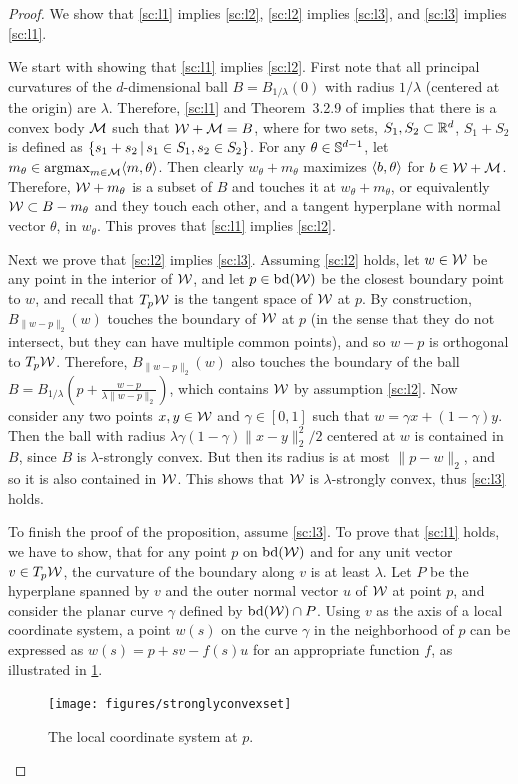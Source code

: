 \begin{proof}
We show that \eqref{sc:l1} implies \eqref{sc:l2}, \eqref{sc:l2} implies \eqref{sc:l3}, and \eqref{sc:l3} implies \eqref{sc:l1}. 

We start with showing that \eqref{sc:l1} implies \eqref{sc:l2}.
First note that all principal curvatures of the $d$-dimensional ball $B=B_{1/\lambda}(0)$ with radius $1/\lambda$ (centered at the origin) are $\lambda$. Therefore, \eqref{sc:l1} and Theorem~3.2.9 of \citet{Sch14:ConvexBodies} implies that there is a convex body $\mathcal{M}$ such that $\mathcal{W}+\mathcal{M}=B$, where for two sets, $S_1, S_2 \subset \mathbb{R}^d$, $S_1+S_2$ is defined as $\left\{s_1+s_2 \,\vert\, s_1 \in S_1, s_2\in S_2 \right\}$. For any $\theta \in \mathbb{S}^{d-1}$, let $m_\theta \in \operatorname*{argmax}_{m \in \mathcal{M}} \langle m,\theta\rangle$. Then clearly $w_\theta+m_\theta$ maximizes $\langle b,\theta\rangle$ for $b \in \mathcal{W}+\mathcal{M}$. Therefore, $\mathcal{W} + m_\theta$ is a subset of $B$ and touches it at $w_\theta+m_\theta$, or equivalently $\mathcal{W} \subset B-m_\theta$ and they touch each other, and a tangent hyperplane with normal vector $\theta$, in $w_\theta$. This proves that \eqref{sc:l1} implies \eqref{sc:l2}. 

Next we prove that  \eqref{sc:l2} implies \eqref{sc:l3}. Assuming \eqref{sc:l2} holds, let $w \in \mathcal{W}$ be any point in the interior of $\mathcal{W}$, and let $p \in \mathrm{bd}(\mathcal{W})$ be the closest boundary point to $w$, and recall that $T_p\mathcal{W}$ is the tangent space of $\mathcal{W}$ at $p$. By construction, $B_{\|w-p\|_2}(w)$ touches the boundary of $\mathcal{W}$ at $p$ (in the sense that they do not intersect, but they can have multiple common points), and so $w-p$ is orthogonal to $T_p\mathcal{W}$. Therefore,  $B_{\|w-p\|_2}(w)$ also touches the boundary of the ball $B=B_{1/\lambda}(p+\frac{w-p}{\lambda \|w-p\|_2})$, which contains $\mathcal{W}$ by assumption \eqref{sc:l2}. Now consider any two points $x,y \in \mathcal{W}$ and $\gamma \in [0,1]$ such that $w=\gamma x + (1-\gamma) y$. Then the ball with radius $\lambda \gamma (1-\gamma) \|x-y\|_2^2/2$ centered at $w$ is contained in $B$, since $B$ is $\lambda$-strongly convex. But then its radius is at most $\|p-w\|_2$, and so it is also contained in $\mathcal{W}$. This shows that $\mathcal{W}$ is $\lambda$-strongly convex, thus  \eqref{sc:l3} holds.

To finish the proof of the proposition, assume \eqref{sc:l3}. To prove that \eqref{sc:l1} holds, we have to show, that for any point $p$ on $\mathrm{bd}(\mathcal{W})$ and for any unit vector $v \in T_p\mathcal{W}$, the curvature of the boundary along $v$ is at least $\lambda$.
Let $P$ be the hyperplane spanned by $v$ and the outer normal vector $u$ of $\mathcal{W}$ at point $p$, and consider the planar curve $\gamma$ defined by $\mathrm{bd}(\mathcal{W}) \cap P$.
Using $v$ as the axis of a local coordinate system, a point $w(s)$ on the curve $\gamma$ in the neighborhood of $p$ can be expressed as $w(s) = p + sv - f(s)u$ for an appropriate function $f$, as illustrated in \cref{fig:stronglyconvexset}.
\begin{figure}[h]
\centering
	\texttt{[image: figures/stronglyconvexset]}
	\caption{The local coordinate system at $p$. \label{fig:stronglyconvexset}}
\end{figure} 


\end{proof}
